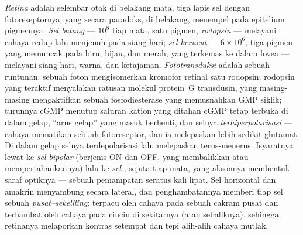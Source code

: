 \begin{definition}[Retina]\label{def:b3:sensory-systems:retina}
%
\emph{Retina} adalah selembar otak di belakang mata, tiga
lapis sel dengan fotoreseptornya, yang secara paradoks, di belakang,
menempel pada epitelium pigmennya. \emph{Sel batang} --- $10^{8}$ tiap mata, satu
pigmen, \emph{rodopsin} --- melayani cahaya redup lalu menjenuh pada siang hari;
\emph{sel kerucut} --- $6\times 10^{6}$, tiga pigmen yang memuncak pada biru,
hijau, dan merah, yang terkemas ke dalam fovea --- melayani siang hari, warna, dan
ketajaman. \emph{Fototransduksi} adalah sebuah runtunan: sebuah foton
mengisomerkan kromofor retinal satu rodopsin; rodopsin yang teraktif menyalakan
ratusan molekul protein~G transdusin, yang masing-masing
mengaktifkan sebuah fosfodiesterase yang memusnahkan GMP siklik; turunnya
cGMP menutup saluran kation yang ditahan cGMP tetap terbuka di dalam gelap,
``arus gelap'' yang masuk berhenti, dan selnya \emph{terhiperpolarisasi} ---
cahaya mematikan sebuah fotoreseptor, dan ia melepaskan lebih sedikit glutamat. Di dalam
gelap selnya terdepolarisasi lalu melepaskan terus-menerus. Isyaratnya
lewat ke \emph{sel bipolar} (berjenis ON dan OFF, yang membalikkan atau
mempertahankannya) lalu ke \emph{sel }, sejuta tiap mata,
yang aksonnya membentuk saraf optiknya --- sebuah pemampatan seratus kali lipat.
Sel horizontal dan amakrin menyambung secara lateral, dan penghambatannya
memberi tiap sel  sebuah  \emph{pusat--sekeliling}:
terpacu oleh cahaya pada sebuah cakram pusat dan terhambat oleh cahaya pada cincin
di sekitarnya (atau sebaliknya), sehingga retinanya melaporkan kontras setempat
dan tepi alih-alih cahaya mutlak.
\end{definition}

